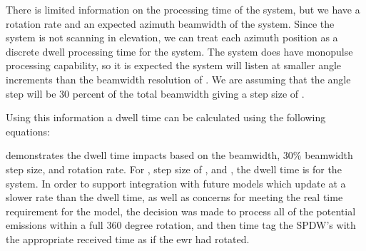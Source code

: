 
\unclass There is limited information on the processing time of the system, but we have a rotation rate and an expected azimuth beamwidth of the system. Since the system is not scanning in elevation, we can treat each azimuth position as a discrete dwell processing time for the system. The system does have monopulse processing capability, so it is expected the system will listen at smaller angle increments than the beamwidth resolution of \azimuthBeamwidthDeg. We are assuming that the angle step will be 30 percent of the total beamwidth giving a step size of \monopulseAzimuthMeasurement.

\unclass Using this information a dwell time can be calculated using the following equations:




\classlabelshort {} demonstrates the dwell time impacts based on the beamwidth, 30\% beamwidth step size, and rotation rate. For \azimuthBeamwidthDeg, step size of \monopulseAzimuthMeasurement, and  \EwrRotationRateRpm, the dwell time is \EwrDwellTime for the system. In order to support integration with future models which update at a slower rate than the dwell time, as well as concerns for meeting the real time requirement for the model, the decision was made to process all of the potential emissions within a full 360 degree rotation, and then time tag the SPDW's with the appropriate received time as if the \gls{ewr} had rotated.

